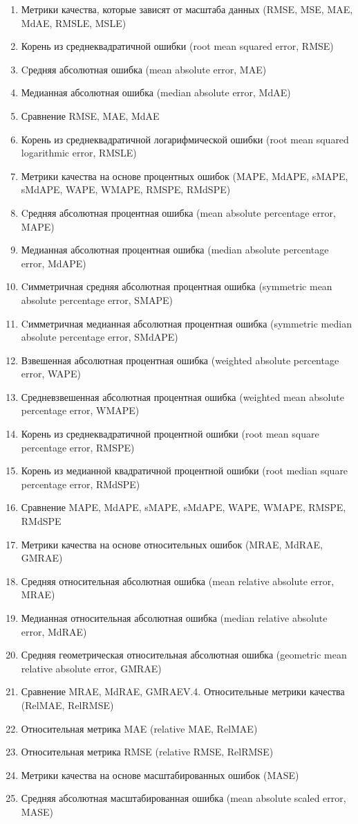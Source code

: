 \begin{enumerate}
  \item Метрики качества, которые зависят от масштаба данных
    (RMSE, MSE, MAE, MdAE, RMSLE, MSLE)
  \item Корень из среднеквадратичной ошибки (root mean squared error, RMSE)
  \item Cредняя абсолютная ошибка (mean absolute error, MAE)
  \item Медианная абсолютная ошибка (median absolute error, MdAE)
  \item Сравнение RMSE, MAE, MdAE
  \item Корень из среднеквадратичной логарифмической ошибки
    (root mean squared logarithmic error, RMSLE)
  \item Метрики качества на основе процентных ошибок
    (MAPE, MdAPE, sMAPE, sMdAPE, WAPE, WMAPE, RMSPE, RMdSPE)
  \item Cредняя абсолютная процентная ошибка
    (mean absolute percentage error, MAPE)
  \item Медианная абсолютная процентная ошибка
    (median absolute percentage error, MdAPE)
  \item Cимметричная средняя абсолютная процентная ошибка
    (symmetric mean absolute percentage error, SMAPE)
  \item Cимметричная медианная абсолютная процентная ошибка
    (symmetric median absolute percentage error, SMdAPE)
  \item Взвешенная абсолютная процентная ошибка
    (weighted absolute percentage error, WAPE)
  \item Средневзвешенная абсолютная процентная ошибка
    (weighted mean absolute percentage error, WMAPE)
  \item Корень из среднеквадратичной процентной ошибки
    (root mean square percentage error, RMSPE)
  \item Корень из медианной квадратичной процентной ошибки
    (root median square percentage error, RMdSPE)
  \item Сравнение MAPE, MdAPE, sMAPE, sMdAPE, WAPE, WMAPE,
    RMSPE, RMdSPE
  \item Метрики качества на основе относительных ошибок
    (MRAE, MdRAE, GMRAE)
  \item Средняя относительная абсолютная ошибка
    (mean relative absolute error, MRAE)
  \item Медианная относительная абсолютная ошибка
    (median relative absolute error, MdRAE)
  \item Средняя геометрическая относительная абсолютная ошибка
    (geometric mean relative absolute error, GMRAE)
  \item Сравнение MRAE, MdRAE, GMRAEV.4. Относительные метрики
    качества (RelMAE, RelRMSE)
  \item Относительная метрика MAE (relative MAE, RelMAE)
  \item Относительная метрика RMSE (relative RMSE, RelRMSE)
  \item Метрики качества на основе масштабированных ошибок
    (MASE)
  \item Средняя абсолютная масштабированная ошибка
    (mean absolute scaled error, MASE)


\end{enumerate}

